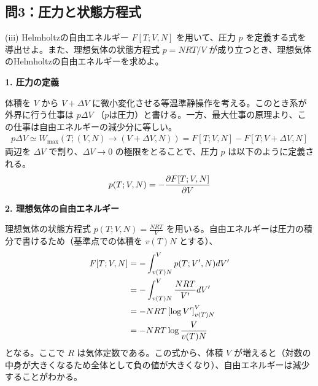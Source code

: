 \documentclass[a4paper,12pt]{jlreq}
\begin{document}
\vspace{10mm}

\subsection*{問3：圧力と状態方程式}

\begin{itembox}[l]{(iii)}
  Helmholtzの自由エネルギー $F[T; V, N]$ を用いて、圧力 $p$ を定義する式を導出せよ。また、理想気体の状態方程式 $p = NRT/V$ が成り立つとき、理想気体のHelmholtzの自由エネルギーを求めよ。
\end{itembox}

\vspace{5mm}

\par
\textbf{1. 圧力の定義} \par
体積を $V$ から $V + \Delta V$ に微小変化させる等温準静操作を考える。このとき系が外界に行う仕事は $p \Delta V$ （$p$は圧力）と書ける。一方、最大仕事の原理より、この仕事は自由エネルギーの減少分に等しい。
\begin{align}
  p \Delta V \simeq W_{\max}(T; (V, N) \to (V+\Delta V, N)) = F[T; V, N] - F[T; V+\Delta V, N]
\end{align}
両辺を $\Delta V$ で割り、$\Delta V \to 0$ の極限をとることで、圧力 $p$ は以下のように定義される。
\begin{align}
  p(T; V, N) = -\pdv{F[T; V, N]}{V}
\end{align}

\textbf{2. 理想気体の自由エネルギー} \par
理想気体の状態方程式 $p(T; V, N) = \frac{NRT}{V}$ を用いる。自由エネルギーは圧力の積分で書けるため（基準点での体積を $v(T)N$ とする）、
\begin{align}
  F[T; V, N] &= - \int_{v(T)N}^{V} p(T; V', N) dV' \notag \\
  &= - \int_{v(T)N}^{V} \frac{NRT}{V'} dV' \notag \\
  &= - NRT \left[ \log V' \right]_{v(T)N}^{V} \notag \\
  &= - NRT \log \frac{V}{v(T)N}
\end{align}
となる。ここで $R$ は気体定数である。この式から、体積 $V$ が増えると（対数の中身が大きくなるため全体として負の値が大きくなり）、自由エネルギーは減少することがわかる。






\newpage
\end{document}
